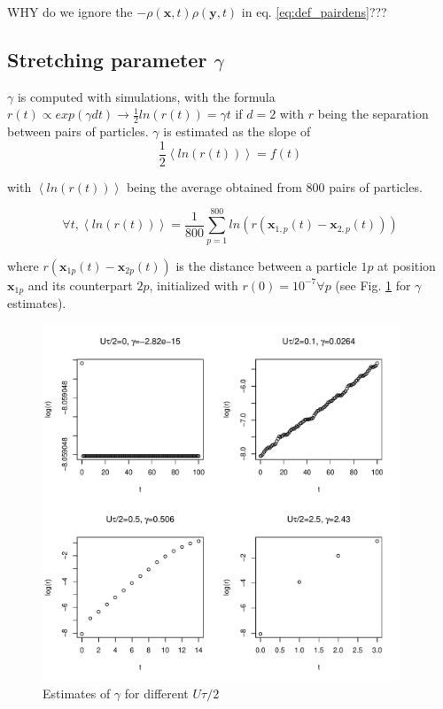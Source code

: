 WHY do we ignore the $-\rho(\boldsymbol{x},t)\rho(\boldsymbol{y},t)$
in eq. \ref{eq:def_pairdens}???


\subsection*{Stretching parameter $\gamma$}


$\gamma$ is computed with simulations, with the formula $r(t)\propto exp(\gamma dt)\rightarrow\frac{1}{2}ln(r(t))=\gamma t$
if $d=2$ with $r$ being the separation between pairs of particles. $\gamma$ is estimated as the slope of $$\frac{1}{2}\left\langle ln(r(t))\right\rangle =f(t)$$

with $\left\langle ln(r(t))\right\rangle $ being the average obtained from 800 pairs of particles. 

$$\forall t,\left\langle ln(r(t))\right\rangle =\frac{1}{800}\sum_{p=1}^{800}ln(r(\boldsymbol{x}_{1,p}(t)-\boldsymbol{x}_{2,p}(t)))$$ 

where $r(\boldsymbol{x}_{1p}(t)-\boldsymbol{x}_{2p}(t))$ is the distance between a particle $1p$ at position $\boldsymbol{x}_{1p}$ and its counterpart $2p$, initialized with $r(0)=10^{-7}\forall p$ (see
Fig. \ref{fig:gamma_Utot} for $\gamma$ estimates).

\begin{figure}[H]
\begin{centering}
\includegraphics[width=0.95\textwidth]{../code/figure/gamma_for_different_Utot.pdf}
\par\end{centering}
\caption{Estimates of $\gamma$ for different $U\tau/2$\label{fig:gamma_Utot}}
\end{figure}

